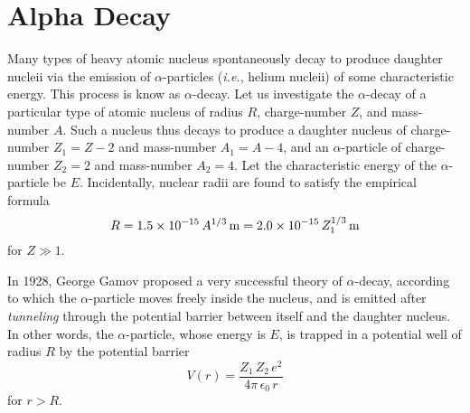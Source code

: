 \section{Alpha Decay}
Many types of heavy atomic nucleus spontaneously decay to produce  daughter nucleii
via the emission of $\alpha$-particles ({\em i.e.},  helium nucleii) of some characteristic energy.
This process is know as
$\alpha$-decay. Let us investigate the $\alpha$-decay of a particular type of atomic nucleus of radius $R$, charge-number $Z$,
and mass-number $A$. Such a nucleus thus decays to produce a daughter
nucleus of charge-number $Z_1=Z-2$ and mass-number $A_1=A-4$,
and an $\alpha$-particle of charge-number $Z_2=2$ and mass-number
$A_2=4$. Let the characteristic energy of the $\alpha$-particle
be $E$. Incidentally, nuclear radii
are found to satisfy the empirical formula
\begin{equation}
R = 1.5\times 10^{-15}\,A^{1/3}\,{\rm m}=2.0\times 10^{-15}\,Z_1^{1/3}\,{\rm m}
\end{equation}
for $Z\gg 1$.

In 1928, George Gamov proposed a very successful theory of $\alpha$-decay,
according to which the $\alpha$-particle moves freely inside the nucleus, and is emitted after {\em tunneling}\/ through the
potential barrier between itself and the daughter nucleus.  In other words,
the $\alpha$-particle, whose energy is $E$, is trapped in a potential well of radius $R$ by the
potential barrier
\begin{equation}
V(r) = \frac{Z_1\,Z_2\,e^2}{4\pi\,\epsilon_0\,r}
\end{equation}
for $r>R$. 

